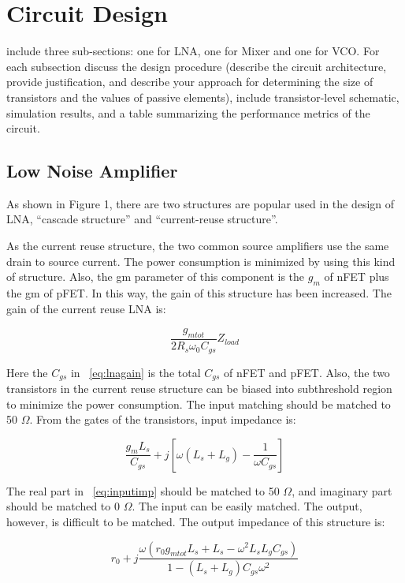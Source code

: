 \section{Circuit Design}
include three sub-sections: one for LNA, one for Mixer and one for VCO. For each subsection discuss the design procedure (describe the circuit architecture, provide justification, and describe your approach for determining the size of transistors and the values of passive elements), include transistor-level schematic, simulation results, and a table summarizing the performance metrics of the circuit.

\subsection{Low Noise Amplifier}
As shown in Figure 1, there are two structures are popular used in the design of LNA, “cascade structure” and “current-reuse structure”. 


As the current reuse structure, the two common source amplifiers use the same drain to source current. The power consumption is minimized by using this kind of structure. Also, the gm parameter of this component is the $g_m$ of nFET plus the gm of pFET. In this way, the gain of this structure has been increased. The gain of the current reuse LNA is:

\begin{equation} 
  	\frac{g_{mtot}}{2R_s \omega_0 C_{gs}}Z_{load}
	\label{eq:lnagain}
\end{equation}

Here the $C_{gs}$ in ~\ref{eq:lnagain} is the total $C_{gs}$ of nFET and pFET. Also, the two transistors in the current reuse structure can be biased into subthreshold region to minimize the power consumption. The input matching should be matched to 50 $\Omega$. From the gates of the transistors, input impedance is:

\begin{equation} 
  	\frac{g_mL_s}{C_{gs}} + j[\omega (L_s+L_g) - \frac{1}{\omega C_{gs}}]
	\label{eq:inputimp}
\end{equation}

The real part in ~\ref{eq:inputimp} should be matched to 50 $\Omega$, and imaginary part should be matched to 0 $\Omega$. The input can be easily matched. The output, however, is difficult to be matched. The output impedance of this structure is:

\begin{equation} 
  	r_0 + j\frac{\omega(r_0g_{mtot}L_s+L_s-\omega^2L_sL_gC_{gs})}{1-(L_s+L_g)C_{gs}\omega^2}
\end{equation}

